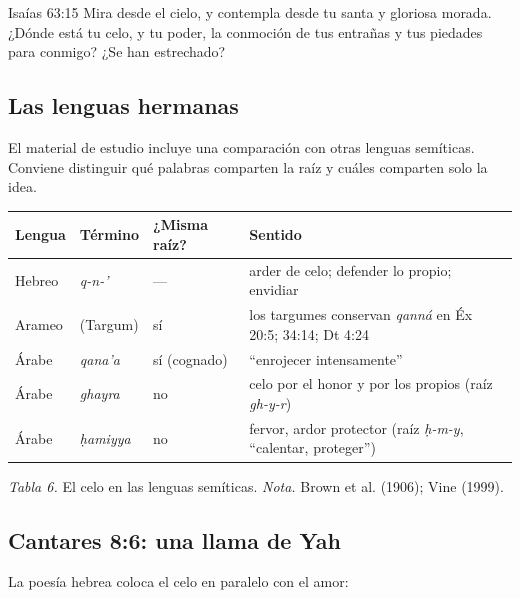 \begin{verso}{Isaías 63:15}
Mira desde el cielo, y contempla desde tu santa y gloriosa morada. ¿Dónde está tu celo, y tu poder, la conmoción de tus entrañas y tus piedades para conmigo? ¿Se han estrechado?
\end{verso}

\subsection{Las lenguas hermanas}
El material de estudio incluye una comparación con otras lenguas semíticas. Conviene distinguir qué palabras comparten la raíz y cuáles comparten solo la idea.

\begin{center}\small\renewcommand{\arraystretch}{1.15}
\begin{tabular}{@{}L{1.7cm}L{2.8cm}L{2.2cm}L{7.0cm}@{}}
\toprule
\textbf{Lengua} & \textbf{Término} & \textbf{¿Misma raíz?} & \textbf{Sentido} \\ \midrule
Hebreo &  \emph{q-n-'} & --- & arder de celo; defender lo propio; envidiar \\
Arameo &  (Targum) & sí & los targumes conservan \emph{qanná} en Éx 20:5; 34:14; Dt 4:24 \\
Árabe & \emph{qana'a} & sí (cognado) & ``enrojecer intensamente'' \\
Árabe & \emph{ghayra} & no & celo por el honor y por los propios (raíz \emph{gh-y-r}) \\
Árabe & \emph{ḥamiyya} & no & fervor, ardor protector (raíz \emph{ḥ-m-y}, ``calentar, proteger'') \\
\bottomrule
\end{tabular}\par
{\footnotesize\color{gris}\textit{Tabla 6.} El celo en las lenguas semíticas. \textit{Nota.} Brown et al. (1906); Vine (1999).}
\end{center}


\subsection{Cantares 8:6: una llama de Yah}
La poesía hebrea coloca el celo en paralelo con el amor:

